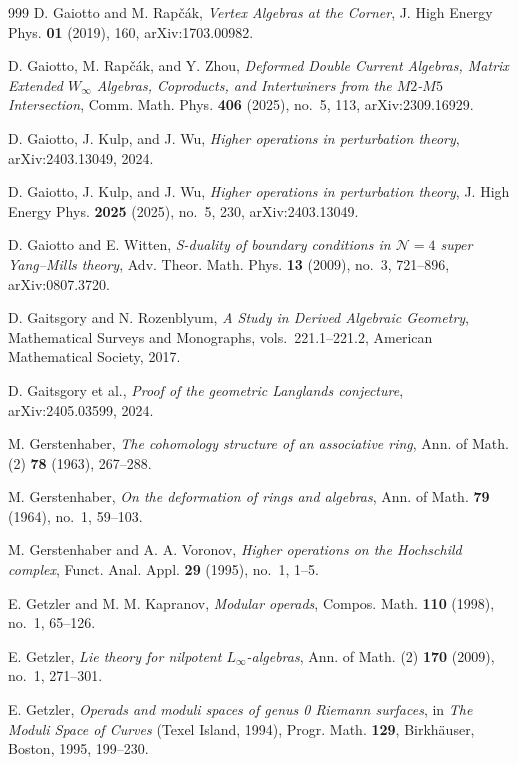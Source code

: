 \begin{thebibliography}{999}
D. Gaiotto and M. Rap\v{c}\'ak, \emph{Vertex Algebras at the Corner}, J. High Energy Phys. \textbf{01} (2019), 160, arXiv:1703.00982.

D. Gaiotto, M. Rap\v{c}\'ak, and Y. Zhou, \emph{Deformed Double Current Algebras, Matrix Extended $W_\infty$ Algebras, Coproducts, and Intertwiners from the $M2$-$M5$ Intersection}, Comm. Math. Phys. \textbf{406} (2025), no.~5, 113, arXiv:2309.16929.

D. Gaiotto, J. Kulp, and J. Wu, \emph{Higher operations in perturbation theory}, arXiv:2403.13049, 2024.

D. Gaiotto, J. Kulp, and J. Wu, \emph{Higher operations in perturbation theory}, J. High Energy Phys. \textbf{2025} (2025), no.~5, 230, arXiv:2403.13049.

D. Gaiotto and E. Witten, \emph{S-duality of boundary conditions in $\mathcal{N}=4$ super Yang--Mills theory}, Adv. Theor. Math. Phys. \textbf{13} (2009), no.~3, 721--896, arXiv:0807.3720.

D. Gaitsgory and N. Rozenblyum, \emph{A Study in Derived Algebraic Geometry}, Mathematical Surveys and Monographs, vols.~221.1--221.2, American Mathematical Society, 2017.

D. Gaitsgory et al., \emph{Proof of the geometric Langlands conjecture}, arXiv:2405.03599, 2024.

M. Gerstenhaber, \emph{The cohomology structure of an associative ring}, Ann. of Math. (2) \textbf{78} (1963), 267--288.

M. Gerstenhaber, \emph{On the deformation of rings and algebras}, Ann. of Math. \textbf{79} (1964), no.~1, 59--103.

M. Gerstenhaber and A. A. Voronov,
\emph{Higher operations on the Hochschild complex},
Funct. Anal. Appl. \textbf{29} (1995), no.~1, 1--5.

E. Getzler and M. M. Kapranov, \emph{Modular operads}, Compos. Math. \textbf{110} (1998), no.~1, 65--126.

E. Getzler, \emph{Lie theory for nilpotent $L_\infty$-algebras}, Ann. of Math. (2) \textbf{170} (2009), no.~1, 271--301.

E. Getzler, \emph{Operads and moduli spaces of genus 0 Riemann surfaces}, in \emph{The Moduli Space of Curves} (Texel Island, 1994), Progr. Math. \textbf{129}, Birkh\"auser, Boston, 1995, 199--230.


\end{thebibliography}
